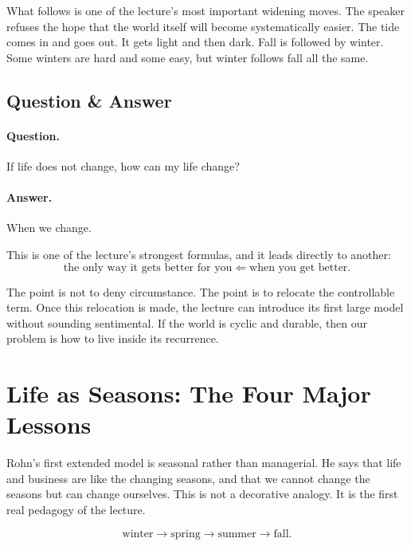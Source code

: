 What follows is one of the lecture's most important widening moves. The speaker refuses the hope that the world itself will become systematically easier. The tide comes in and goes out. It gets light and then dark. Fall is followed by winter. Some winters are hard and some easy, but winter follows fall all the same.

\subsection{Question \& Answer}

\paragraph{Question.} If life does not change, how can my life change?

\paragraph{Answer.} When we change.

This is one of the lecture's strongest formulas, and it leads directly to another:
\begin{equation}
\text{the only way it gets better for you} \Leftarrow \text{when you get better}.
\end{equation}

The point is not to deny circumstance. The point is to relocate the controllable term. Once this relocation is made, the lecture can introduce its first large model without sounding sentimental. If the world is cyclic and durable, then our problem is how to live inside its recurrence.

\section{Life as Seasons: The Four Major Lessons}

Rohn's first extended model is seasonal rather than managerial. He says that life and business are like the changing seasons, and that we cannot change the seasons but can change ourselves. This is not a decorative analogy. It is the first real pedagogy of the lecture.

\begin{equation}
\text{winter} \to \text{spring} \to \text{summer} \to \text{fall}.
\end{equation}

